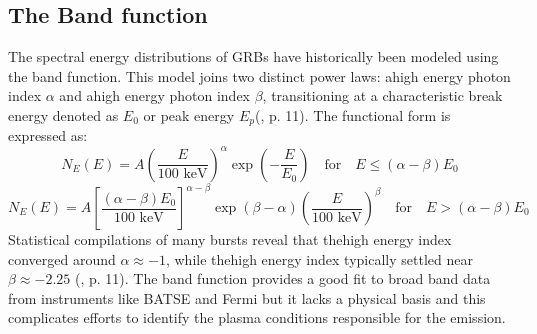 \documentclass{aa} %
\begin{document}
\subsection{The Band function}

The spectral energy distributions of GRBs have historically been modeled using the band function. This model joins two distinct power laws: ahigh energy photon index $\alpha$ and ahigh energy photon index $\beta$, transitioning at a characteristic break energy denoted as $E_0$ or peak energy $E_p$(\citet{KumarandZhang2015}, p. 11). The functional form is expressed as:
\begin{equation}
    N_E(E) = A \left( \frac{E}{100 \text{ keV}} \right)^\alpha \exp\left(-\frac{E}{E_0}\right) \quad \text{for} \quad E \le (\alpha - \beta)E_0
\end{equation}
\begin{equation}
    N_E(E) = A \left[ \frac{(\alpha - \beta)E_0}{100 \text{ keV}} \right]^{\alpha - \beta} \exp(\beta - \alpha) \left( \frac{E}{100 \text{ keV}} \right)^\beta \quad \text{for} \quad E > (\alpha - \beta)E_0
\end{equation}
Statistical compilations of many bursts reveal that thehigh energy index converged around $\alpha \approx -1$, while thehigh energy index typically settled near $\beta \approx -2.25$ (\citet{KumarandZhang2015}, p. 11). The band function provides a good fit to broad band data from instruments like BATSE and Fermi but it lacks a physical basis and this complicates efforts to identify the plasma conditions responsible for the emission.
\end{document}
